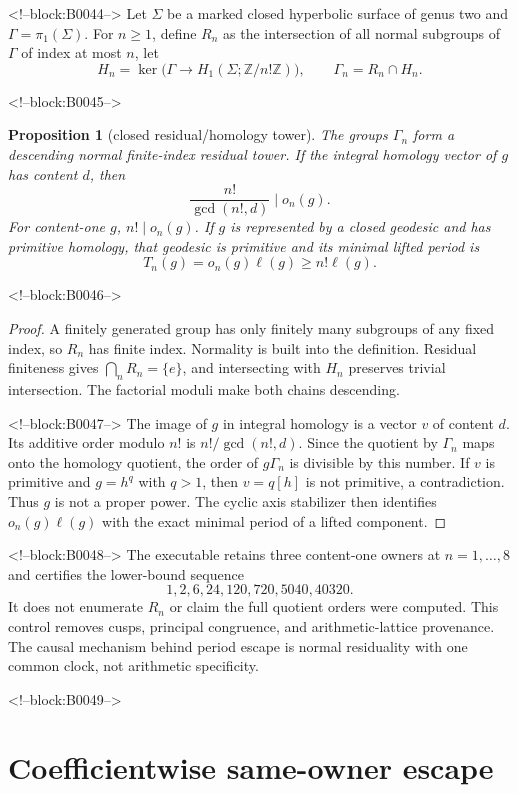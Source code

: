\documentclass[11pt]{article}
\newtheorem{proposition}[theorem]{Proposition}
\theoremstyle{definition}
\theoremstyle{remark}
\newcommand{\ZZ}{\mathbb Z}
\begin{document}
<!--block:B0044-->
Let $\Sigma$ be a marked closed hyperbolic surface of genus two and $\Gamma=\pi_1(\Sigma)$. For $n\geq1$, define $R_n$ as the intersection of all normal subgroups of $\Gamma$ of index at most $n$, let
\[
H_n=\ker\bigl(\Gamma\to H_1(\Sigma;\ZZ/n!\ZZ)\bigr),
\qquad
\Gamma_n=R_n\cap H_n.
\]

<!--block:B0045-->
\begin{proposition}[closed residual/homology tower]\label{prop:closed}
The groups $\Gamma_n$ form a descending normal finite-index residual tower. If the integral homology vector of $g$ has content $d$, then
\[
\frac{n!}{\gcd(n!,d)}\mid o_n(g).
\]
For content-one $g$, $n!\mid o_n(g)$. If $g$ is represented by a closed geodesic and has primitive homology, that geodesic is primitive and its minimal lifted period is
\[
T_n(g)=o_n(g)\ell(g)\geq n!\ell(g).
\]
\end{proposition}

<!--block:B0046-->
\begin{proof}
A finitely generated group has only finitely many subgroups of any fixed index, so $R_n$ has finite index. Normality is built into the definition. Residual finiteness gives $\bigcap_nR_n=\{e\}$, and intersecting with $H_n$ preserves trivial intersection. The factorial moduli make both chains descending.

<!--block:B0047-->
The image of $g$ in integral homology is a vector $v$ of content $d$. Its additive order modulo $n!$ is $n!/\gcd(n!,d)$. Since the quotient by $\Gamma_n$ maps onto the homology quotient, the order of $g\Gamma_n$ is divisible by this number. If $v$ is primitive and $g=h^q$ with $q>1$, then $v=q[h]$ is not primitive, a contradiction. Thus $g$ is not a proper power. The cyclic axis stabilizer then identifies $o_n(g)\ell(g)$ with the exact minimal period of a lifted component.
\end{proof}

<!--block:B0048-->
The executable retains three content-one owners at $n=1,\ldots,8$ and certifies the lower-bound sequence
\[
1,2,6,24,120,720,5040,40320.
\]
It does not enumerate $R_n$ or claim the full quotient orders were computed. This control removes cusps, principal congruence, and arithmetic-lattice provenance. The causal mechanism behind period escape is normal residuality with one common clock, not arithmetic specificity.

<!--block:B0049-->
\section{Coefficientwise same-owner escape}
\end{document}
